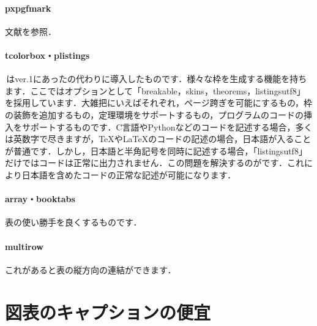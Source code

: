 \documentclass[uplatex]{jsreport}
\begin{document}
\paragraph{pxpgfmark} 文献\cite{pxpgfmark}を参照．
\paragraph{tcolorbox・plistings} \cite{tcolorbox}\,はver.1にあったの代わりに導入したものです．様々な枠を生成する機能を持ちます．ここではオプションとして「breakable，skins，theorems，listingsutf8」を採用しています．大雑把にいえばそれぞれ，ページ跨ぎを可能にするもの，枠の装飾を追加するもの，定理環境をサポートするもの，プログラムのコードの挿入をサポートするものです．C言語やPythonなどのコードを記述する場合，多くは英数字で尽きますが，{\TeX}や{\LaTeX}のコードの記述の場合，日本語が入ることが普通です．しかし，日本語と半角記号を同時に記述する場合，「listingsutf8」だけではコードは正常に出力されません．この問題を解決するのがです\cite{plistings}．これにより日本語を含めたコードの正常な記述が可能になります．
\paragraph{array・booktabs} 表の使い勝手を良くするものです\cite{array,booktabs}．
\paragraph{multirow} これがあると表の縦方向の連結ができます\cite{multirow}．


\section{図表のキャプションの便宜}
\end{document}
